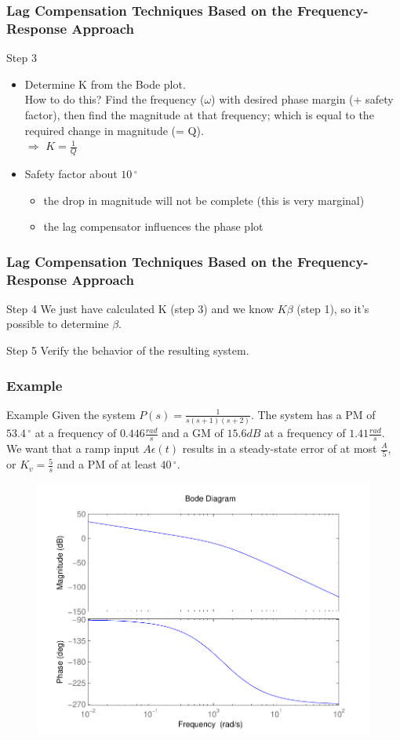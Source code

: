 \begin{frame}
\frametitle{Lag Compensation Techniques Based on the Frequency-Response Approach}
\begin{block}{Step 3}
	\begin{itemize}
	\item	Determine K from the Bode plot. \\
		How to do this?
		Find the frequency ($\omega$) with desired phase margin (+ safety factor), then find the magnitude at that frequency; which is equal to the required change in magnitude (= Q). \\
		$\Rightarrow$ $K = \frac{1}{Q}$ \\
		\item Safety factor about $10\,^{\circ}$
		\begin{itemize}
			\item the drop in magnitude will not be complete (this is very marginal)
			\item the lag compensator influences the phase plot
		\end{itemize}
	\end{itemize}
\end{block}
\end{frame}

\begin{frame}
\frametitle{Lag Compensation Techniques Based on the Frequency-Response Approach}
\begin{block}{Step 4}
	We just have calculated K (step 3) and we know $K\beta$ (step 1), so it's possible to determine $\beta$.
\end{block}
\begin{block}{Step 5}
	Verify the behavior of the resulting system.
\end{block}
\end{frame}

\begin{frame}
\frametitle{Example}
\begin{block}{Example}
Given the system $P(s) = \frac{1}{s(s+1)(s+2)}$. The system has a PM of $53.4\,^{\circ}$ at a frequency of $0.446\frac{rad}{s}$ and a GM of $15.6 dB$ at a frequency of $1.41\frac{rad}{s}$.
We want that a ramp input $A\epsilon(t)$ results in a steady-state error of at most $\frac{A}{5}$, or $K_v =\frac{5}{s}$ and a PM of at least $40\,^{\circ}$.
\begin{figure}
	\centering
	\includegraphics[width=0.5
	\linewidth]{bodeexamplelag}
\end{figure}
\end{block}
\end{frame}

